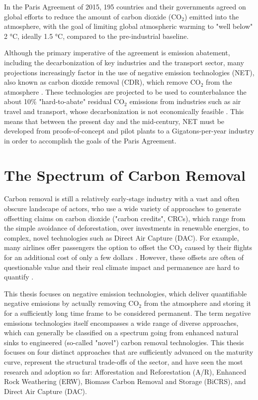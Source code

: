 In the Paris Agreement of 2015, 195 countries and their governments agreed on global efforts to reduce the amount of carbon dioxide (CO$_2$) emitted into the atmosphere, with the goal of limiting global atmospheric warming to "well below" 2 °C, ideally 1.5 °C, compared to the pre-industrial baseline.\vspace{2mm}

Although the primary imperative of the agreement is emission abatement, including the decarbonization of key industries and the transport sector, many projections increasingly factor in the use of negative emission technologies (NET), also known as carbon dioxide removal (CDR), which remove CO$_2$ from the atmosphere \parencite{unep_emissions_2017}. These technologies are projected to be used to counterbalance the about 10\% "hard-to-abate" residual CO$_2$ emissions from industries such as air travel and transport, whose decarbonization is not economically feasible \parencite{prutz_understanding_2023}. This means that between the present day and the mid-century, NET must be developed from proofs-of-concept and pilot plants to a Gigatons-per-year industry in order to accomplish the goals of the Paris Agreement.

\section{The Spectrum of Carbon Removal}
Carbon removal is still a relatively early-stage industry with a vast and often obscure landscape of actors, who use a wide variety of approaches to generate offsetting claims on carbon dioxide ("carbon credits", CRCs), which range from the simple avoidance of deforestation, over investments in renewable energies, to complex, novel technologies such as Direct Air Capture (DAC). For example, many airlines offer passengers the option to offset the CO$_2$ caused by their flights for an additional cost of only a few dollars \parencite{evz_offsetting_2023}. However, these offsets are often of questionable value and their real climate impact and permanence are hard to quantify \parencite{trencher_demand_2024}.\vspace{2mm}

This thesis focuses on negative emission technologies, which deliver quantifiable negative emissions by actually removing CO$_2$ from the atmosphere and storing it for a sufficiently long time frame to be considered permanent. The term negative emissions technologies itself encompasses a wide range of diverse approaches, which can generally be classified on a spectrum going from enhanced natural sinks to engineered (so-called "novel") carbon removal technologies. This thesis focuses on four distinct approaches that are sufficiently advanced on the maturity curve, represent the structural trade-offs of the sector, and have seen the most research and adoption so far: Afforestation and Reforestation (A/R), Enhanced Rock Weathering (ERW), Biomass Carbon Removal and Storage (BiCRS), and Direct Air Capture (DAC).\vspace{2mm}

